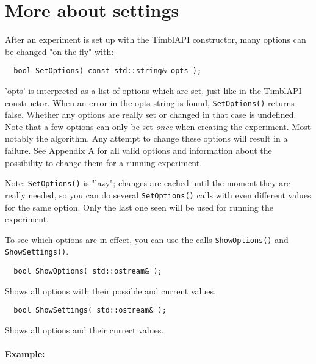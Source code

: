 \section{More about settings}

After an experiment is set up with the TimblAPI constructor, many
options can be changed "on the fly" with:

\begin{footnotesize}
\begin{verbatim}
  bool SetOptions( const std::string& opts );
\end{verbatim}
\end{footnotesize}

'opts' is interpreted as a list of options which are set, just like in
the TimblAPI constructor. When an error in the opts string is found,
{\tt SetOptions()} returns false. Whether any options are really set
or changed in that case is undefined. Note that a few options can only
be set {\em once}\/ when creating the experiment. Most notably the
algorithm. Any attempt to change these options will result in a
failure.  See Appendix A for all valid options and information about
the possibility to change them for a running experiment.

Note: {\tt SetOptions()} is "lazy"; changes are cached until the
moment they are really needed, so you can do several {\tt SetOptions()}
calls with even different values for the same option. Only the last
one seen will be used for running the experiment.

To see which options are in effect, you can use the calls {\tt ShowOptions()}
and {\tt ShowSettings()}.

\begin{footnotesize}
\begin{verbatim}
  bool ShowOptions( std::ostream& );
\end{verbatim}
\end{footnotesize}

Shows all options with their possible and current values.

\begin{footnotesize}
\begin{verbatim}
  bool ShowSettings( std::ostream& );
\end{verbatim}
\end{footnotesize}

Shows all options and their currect values.

\paragraph{Example:}

